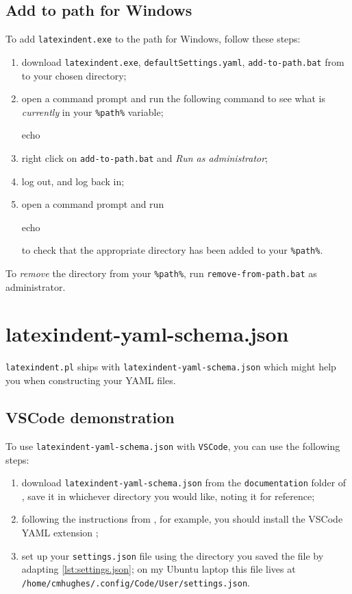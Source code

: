 	\subsection{Add to path for Windows}
		To add \texttt{latexindent.exe} to the path for Windows, follow these steps:
		\begin{enumerate}
			\item download \texttt{latexindent.exe}, \texttt{defaultSettings.yaml},
			      \texttt{add-to-path.bat} from \cite{latexindent-home} to your chosen directory;
			\item open a command prompt and run the following command to see what is \emph{currently} in
			      your \lstinline!%path%! variable;
			      \begin{dosprompt}
echo %
          \end{dosprompt}
			\item right click on \texttt{add-to-path.bat} and \emph{Run as administrator};
			\item log out, and log back in;
			\item open a command prompt and run
			      \begin{dosprompt}
echo %
          \end{dosprompt}
			      to check that the appropriate directory has been added to your \lstinline!%path%!.
		\end{enumerate}
		To \emph{remove} the directory from your \lstinline!%path%!, run
		\texttt{remove-from-path.bat} as administrator.

	\section{latexindent-yaml-schema.json}

	 \texttt{latexindent.pl}
	  ships with
	 \texttt{latexindent-yaml-schema.json}
	 which might help you when constructing your YAML files.

	\subsection{VSCode demonstration}
		To use \texttt{latexindent-yaml-schema.json} with \texttt{VSCode}, you can use the
		following steps:  
		\begin{enumerate}
			\item download \texttt{latexindent-yaml-schema.json} from the \texttt{documentation} folder of
			      \cite{latexindent-home}, save it in whichever directory you would like, noting it for
			      reference;
			\item following the instructions from \cite{vscode-yaml-demo}, for example, you should install
			      the VSCode YAML extension \cite{vscode-yaml-extentions};
			\item set up your \texttt{settings.json} file using the directory you saved the file by
			      adapting \cref{lst:settings.json}; on my Ubuntu laptop this file lives at
			      \texttt{/home/cmhughes/.config/Code/User/settings.json}.
		\end{enumerate}

